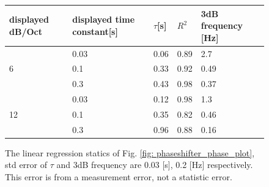 \documentclass{article}
\begin{document}
 \begin{figure}[H]
  \begin{tabular}{  m{3cm} | m{4cm} | m{1cm} | m{1cm} | m{3cm}  } 

    displayed dB/Oct& displayed time constant[s] & $\tau$[s] & $R^2$ & 3dB frequency [Hz]\\ \hline
     \multirow{3}{*}{6}& 0.03  & 0.06 & 0.89 & 2.7 \\ \cline{2-5}
       & 0.1& 0.33 & 0.92 & 0.49\\ \cline{2-5}
       & 0.3& 0.43 & 0.98 & 0.37\\ \hline
       \multirow{3}{*}{12}& 0.03  & 0.12 & 0.98 & 1.3 \\ \cline{2-5}
       & 0.1& 0.35 & 0.82 & 0.46\\ \cline{2-5}
       & 0.3& 0.96 & 0.88 & 0.16\\ \hline
    
  \end{tabular}
  \caption{The linear regression statics of Fig. \ref{fig: phaseshifter_phase_plot}, std error of $\tau$ and 3dB frequency are 0.03 [s], 0.2 [Hz] respectively.
  This error is from a measurement error, not a statistic error.}
  \label{fig: LPF statics}
\end{figure}
\end{document}
